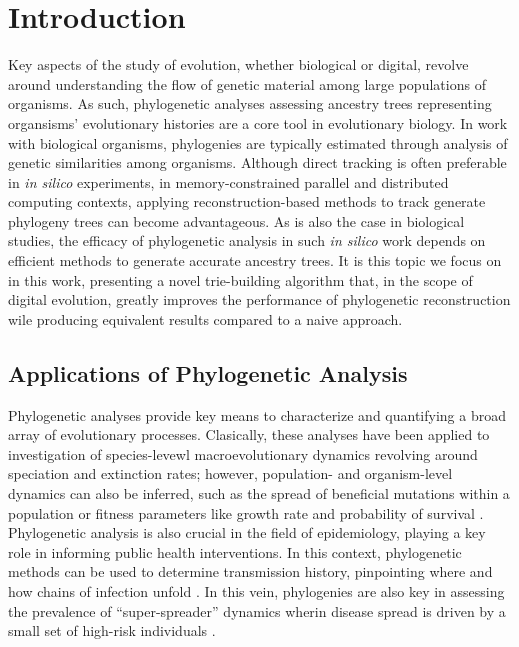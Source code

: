 \section{Introduction} \label{sec:introduction}

Key aspects of the study of evolution, whether biological or digital, revolve around understanding the flow of genetic material among large populations of organisms.
As such, phylogenetic analyses assessing ancestry trees representing organsisms' evolutionary histories are a core tool in evolutionary biology.
In work with biological organisms, phylogenies are typically estimated through analysis of genetic similarities among organisms.
Although direct tracking is often preferable in \textit{in silico} experiments, in memory-constrained parallel and distributed computing contexts, applying reconstruction-based methods to track generate phylogeny trees can become advantageous.
As is also the case in biological studies, the efficacy of phylogenetic analysis in such \textit{in silico} work depends on efficient methods to generate accurate ancestry trees.
It is this topic we focus on in this work, presenting a novel trie-building algorithm that, in the scope of digital evolution, greatly improves the performance of phylogenetic reconstruction wile producing equivalent results compared to a naive approach.

\subsection{Applications of Phylogenetic Analysis}

Phylogenetic analyses provide key means to characterize and quantifying a broad array of evolutionary processes.
Clasically, these analyses have been applied to investigation of species-levewl macroevolutionary dynamics revolving around speciation and extinction rates; however, population- and organism-level dynamics can also be inferred, such as the spread of beneficial mutations within a population or fitness parameters like growth rate and probability of survival \citep{genthon2023cell, levy2015quantitative, stadler2013recovering}.
Phylogenetic analysis is also crucial in the field of epidemiology, playing a key role in informing public health interventions.
In this context, phylogenetic methods can be used to determine transmission history, pinpointing where and how chains of infection unfold \citep{wang2020role}.
In this vein, phylogenies are also key in assessing the prevalence of  ``super-spreader'' dynamics wherin disease spread is driven by a small set of high-risk individuals \citep{colijn2014phylogenetic}.

